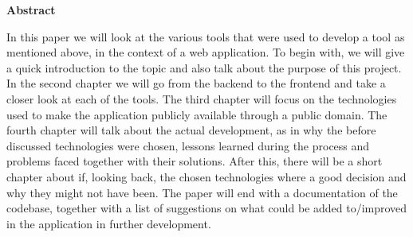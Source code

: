 \newpage

\vspace*{1cm}

\begin{center}
    \textbf{Abstract}
\end{center}

\vspace*{1cm}

\noindent
In this paper we will look at the various tools that were used to develop a tool as mentioned above, in the context of a web application. To begin with, we will give a quick introduction to the topic and also talk about the purpose of this project. In the second chapter we will go from the backend to the frontend and take a closer look at each of the tools. The third chapter will focus on the technologies used to make the application publicly available through a public domain. The fourth chapter will talk about the actual development, as in why the before discussed technologies were chosen, lessons learned during the process and problems faced together with their solutions. After this, there will be a short chapter about if, looking back, the chosen technologies where a good decision and why they might not have been. The paper will end with a documentation of the codebase, together with a list of suggestions on what could be added to/improved in the application in further development.
